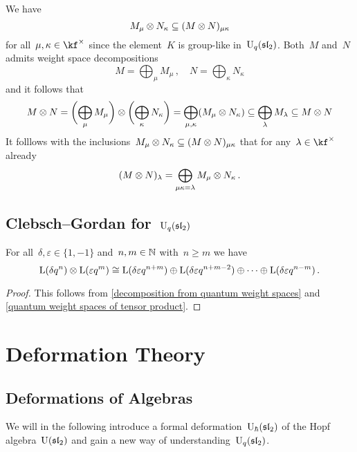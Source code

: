 \documentclass[a4paper, 11pt, oneside]{scrartcl}
\begin{document}
We have
\[
  M_\mu \otimes N_\kappa
  \subseteq
  (M \otimes N)_{\mu \kappa}
\]
for all~$\mu, \kappa \in \kf^\times$ since the element~$K$ is group-like in~$\operatorname{U}_q(\mathfrak{sl}_2)$.
Both~$M$ and~$N$ admits weight space decompositions
\[
  M = \bigoplus_\mu M_\mu \,,
  \quad
  N = \bigoplus_\kappa N_\kappa
\]
and it follows that
\[
  M \otimes N
  =
  \biggl( \bigoplus_\mu M_\mu  \biggr)
  \otimes
  \biggl( \bigoplus_\kappa N_\kappa  \biggr)
  =
  \bigoplus_{\mu, \kappa} (M_\mu \otimes N_\kappa)
  \subseteq
  \bigoplus_{\lambda} M_{\lambda}
  \subseteq
  M \otimes N
\]
It folllows with the inclusions~$M_\mu \otimes N_\kappa \subseteq (M \otimes N)_{\mu \kappa}$ that for any~$\lambda \in \kf^\times$ already
\[
  (M \otimes N)_{\lambda}
  =
  \bigoplus_{\mu \kappa = \lambda}
  M_\mu \otimes N_\kappa \,.
\]



\subsection{Clebsch–Gordan for~\texorpdfstring{$\operatorname{U}_q(\mathfrak{sl}_2)$}{Uq(sl2)}}
\label{quantum clebsch gordan}

\begin{proposition}
  For all~$\delta, \varepsilon \in \{1, -1\}$ and~$n, m \in \mathbb{N}$ with~$n \geq m$ we have
  \[
    \operatorname{L}(\delta q^n) \otimes \operatorname{L}(\varepsilon q^m)
    \cong
    \operatorname{L}(\delta \varepsilon q^{n+m})
    \oplus
    \operatorname{L}(\delta \varepsilon q^{n+m-2})
    \oplus
    \dotsb
    \oplus
    \operatorname{L}(\delta \varepsilon q^{n-m}) \,.
  \]
\end{proposition}

\begin{proof}
  This follows from \cref{decomposition from quantum weight spaces} and \cref{quantum weight spaces of tensor product}.
\end{proof}





\section{Deformation Theory}
\label{deformation theory}



\subsection{Deformations of Algebras}

We will in the following introduce a formal deformation~$\operatorname{U}_{\hbar}(\mathfrak{sl}_2)$ of the Hopf algebra~$\operatorname{U}(\mathfrak{sl}_2)$ and gain a new way of understanding~$\operatorname{U}_q(\mathfrak{sl}_2)$.
\end{document}
